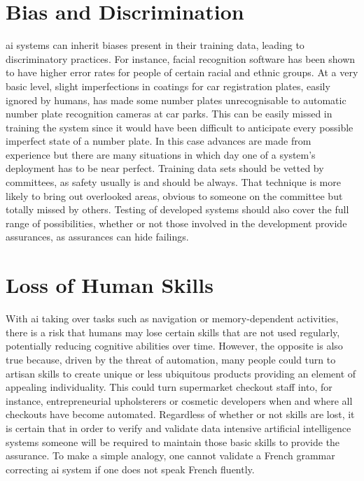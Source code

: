 \section{Bias and Discrimination}
\gls{ai} systems can inherit biases present in their training data, leading to discriminatory practices. For instance, facial recognition software has been shown to have higher error rates for people of certain racial and ethnic groups. At a very basic level, slight imperfections in coatings for car registration plates, easily ignored by humans, has made some number plates unrecognisable to automatic number plate recognition cameras at car parks. This can be easily missed in training the system since it would have been difficult to anticipate every possible imperfect state of a number plate. In this case advances are made from experience but there are many situations in which day one of a system’s deployment has to be near perfect. Training data sets should be vetted by committees, as safety usually is and should be always. That technique is more likely to bring out overlooked areas, obvious to someone on the committee but totally missed by others. Testing of developed systems should also cover the full range of possibilities, whether or not those involved in the development provide assurances, as assurances can hide failings.

\section{Loss of Human Skills}
With \gls{ai} taking over tasks such as navigation or memory-dependent activities, there is a risk that humans may lose certain skills that are not used regularly, potentially reducing cognitive abilities over time.  However, the opposite is also true because, driven by the threat of automation, many people could turn to artisan skills to create unique or less ubiquitous products providing an element of appealing individuality. This could turn supermarket checkout staff into, for instance, entrepreneurial upholsterers or cosmetic developers when and where all checkouts have become automated. Regardless of whether or not skills are lost, it is certain that in order to verify and validate data intensive artificial intelligence systems someone will be required to maintain those basic skills to provide the assurance. To make a simple analogy, one cannot validate a French grammar correcting \gls{ai} system if one does not speak French fluently.

